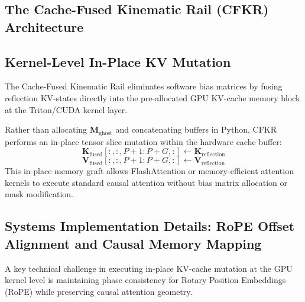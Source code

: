 \documentclass[11pt,twocolumn]{article}
\begin{document}
\begin{enumerate}
\section{The Cache-Fused Kinematic Rail (CFKR) Architecture}

\subsection{Kernel-Level In-Place KV Mutation}
The Cache-Fused Kinematic Rail eliminates software bias matrices by fusing reflection KV-states directly into the pre-allocated GPU KV-cache memory block at the Triton/CUDA kernel layer.

Rather than allocating $\mathbf{M}_{\text{ghost}}$ and concatenating buffers in Python, CFKR performs an in-place tensor slice mutation within the hardware cache buffer:
\begin{equation}
\mathbf{K}_{\text{fused}}[:, :, P+1:P+G, :] \leftarrow \mathbf{K}_{\text{reflection}}
\end{equation}
\begin{equation}
\mathbf{V}_{\text{fused}}[:, :, P+1:P+G, :] \leftarrow \mathbf{V}_{\text{reflection}}
\end{equation}
This in-place memory graft allows FlashAttention or memory-efficient attention kernels to execute standard causal attention without bias matrix allocation or mask modification.

\subsection{Systems Implementation Details: RoPE Offset Alignment and Causal Memory Mapping}
A key technical challenge in executing in-place KV-cache mutation at the GPU kernel level is maintaining phase consistency for Rotary Position Embeddings (RoPE) while preserving causal attention geometry. 


\end{enumerate}
\end{document}
